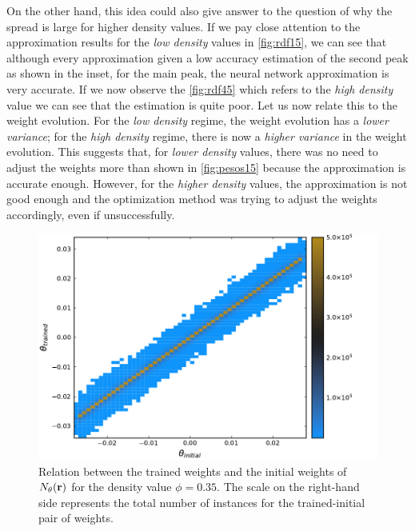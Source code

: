 On the other hand, this idea could also give answer to the question of why the spread
is large for higher density values. If we pay close attention to the approximation
results for the \emph{low density} values in \autoref{fig:rdf15}, we can see that
although every approximation given a low accuracy estimation of the second peak as shown
in the inset, for the main peak, the neural network approximation is very accurate.
If we now observe the \autoref{fig:rdf45} which refers to the \emph{high density} value
we can see that the estimation is quite poor.
Let us now relate this to the weight evolution. For the \emph{low density} regime, the 
weight evolution has a \emph{lower variance}; for the \emph{high density} regime, there
is now a \emph{higher variance} in the weight evolution.
This suggests that, for \emph{lower density} values, there was no need to adjust the
weights more than shown in \autoref{fig:pesos15} because the approximation is accurate
enough. However, for the \emph{higher density} values, the approximation is not good enough
and the optimization method was trying to adjust the weights accordingly, even if
unsuccessfully.

\begin{figure}
    \includegraphics[width=\textwidth]{figuras/capitulo-3/weights_phi=0.35.pdf}
    \caption[Comparison between weights, $\phi=0.35$.]{Relation between the trained weights and the initial weights of $N_{\theta}(\mathbf{r})$ for the density value $\phi=0.35$. The scale on the right-hand side represents the total number of instances for the trained-initial pair of weights.}
    \label{fig:pesos35}
\end{figure}

